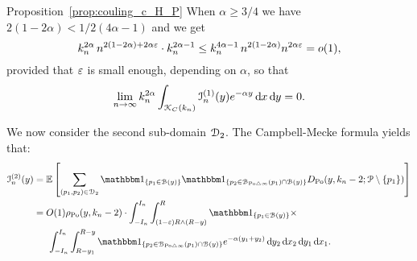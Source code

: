\begin{proofof}{Proposition~\ref{prop:couling_c_H_P}}
When $\alpha \ge 3/4$ we have $2(1-2\alpha) < 1/2(4\alpha - 1)$ and we get
\begin{equation*} 
k_n^{2\alpha} \, n^{2(1-2\alpha) + 2\alpha \varepsilon} \cdot k_n^{2\alpha -1}
\le  k_n^{4\alpha - 1} \, n^{2(1-2\alpha)} n^{2\alpha \varepsilon} = o(1),
\end{equation*}
provided that $\varepsilon$ is small enough, depending on $\alpha$, so that
\[
	\lim_{n \to \infty} k_n^{2\alpha} \int_{{\mathcal K}_{C}(k_n)} \mathcal{I}_n^{(1)}(y) e^{-\alpha y} \operatorname{\mathrm{d}\hspace{-2pt}} x \operatorname{\mathrm{d}\hspace{-2pt}} y = 0.
\]


We now consider the second sub-domain $\mathcal{D}_{2}$. The Campbell-Mecke formula yields that: 
\begin{align*}
	\mathcal{I}_n^{(2)}(y) 
	&= \Exp { \sum_{(p_1,p_2)  \in \dom{2}} \ind{p_1 \in \BallHyp{y}} \ind{p_2 \in \BallSym{p_1} \cap \BallHyp{y}}
		D_{\Po} (y,k_n-2;\Pcal \setminus \{ p_1\})} \\
	&= O(1) \rho_{\Po}(y,k_n-2) \cdot \int_{-I_n}^{I_n} \int_{(1-\eps) R \wedge (R-y)}^{R} 
		\ind{p_1 \in \BallHyp{y}} \times \\
	&\hspace{15pt} \int_{-I_n}^{I_n} \int_{R - y_1}^{R-y} \ind{p_2 \in \BallSym{p_1} \cap \BallHyp{y}}
		e^{-\alpha(y_1 + y_2)} \dd y_2 \dd x_2 \dd y_1 \dd x_1.
\end{align*}


\end{proofof}
